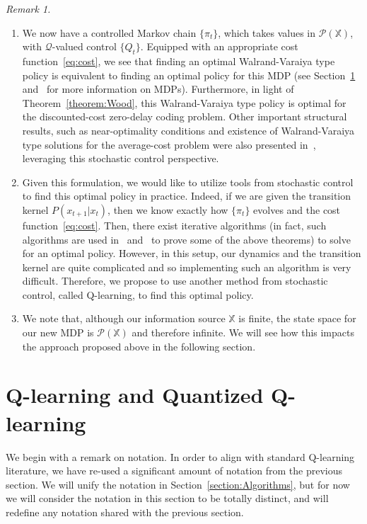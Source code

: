 \documentclass{article}
\begin{document}
\vspace{1em}
\noindent\emph{Remark 1.}\label{remark:1}
\begin{enumerate}
    \item We now have a controlled Markov chain \(\{\pi_t\}\), which takes values in \(\mathcal{P}(\mathbb{X})\), with \(\mathcal{Q}\)-valued control \(\{Q_t\}\). Equipped with an appropriate cost function~\eqref{eq:cost}, we see that finding an optimal Walrand-Varaiya type policy is equivalent to finding an optimal policy for this MDP (see Section~\ref{section:Q-learning} and~\cite{Lerma} for more information on MDPs). Furthermore, in light of Theorem~\ref{theorem:Wood}, this Walrand-Varaiya type policy is optimal for the discounted-cost zero-delay coding problem. Other important structural results, such as near-optimality conditions and existence of Walrand-Varaiya type solutions for the average-cost problem were also presented in~\cite{Wood}, leveraging this stochastic control perspective.
    \item Given this formulation, we would like to utilize tools from stochastic control to find this optimal policy in practice. Indeed, if we are given the transition kernel \(P(x_{t+1} | x_t)\), then we know exactly how \(\{\pi_t\}\) evolves and the cost function~\eqref{eq:cost}. Then, there exist iterative algorithms (in fact, such algorithms are used in~\cite{Witsenhausen} and~\cite{Wood} to prove some of the above theorems) to solve for an optimal policy. However, in this setup, our dynamics and the transition kernel are quite complicated and so implementing such an algorithm is very difficult. Therefore, we propose to use another method from stochastic control, called Q-learning, to find this optimal policy.
    \item We note that, although our information source \(\mathbb{X}\) is finite, the state space for our new MDP is \(\mathcal{P}(\mathbb{X})\) and therefore infinite. We will see how this impacts the approach proposed above in the following section.
\end{enumerate}


\section{Q-learning and Quantized Q-learning}\label{section:Q-learning}
We begin with a remark on notation. In order to align with standard Q-learning literature, we have re-used a significant amount of notation from the previous section. We will unify the notation in Section~\ref{section:Algorithms}, but for now we will consider the notation in this section to be totally distinct, and will redefine any notation shared with the previous section.
\end{document}

